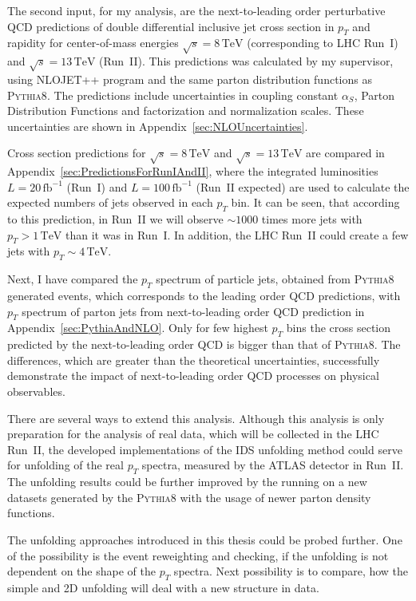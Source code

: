 \documentclass[a4paper,11pt,twoside,openright]{book}
\newcommand{\TeV}{\,\text{TeV}}
\newcommand{\pt}{p_{T}}
\begin{document}
The second input, for my analysis, are the next-to-leading order perturbative QCD
predictions of double differential inclusive jet cross section in $\pt$ and
rapidity for center-of-mass energies $\sqrt{s}=8\TeV$ (corresponding to LHC Run~I)
and $\sqrt{s}=13\TeV$ (Run~II). This predictions was calculated by my supervisor,
using \textsc{NLOJET++} program and the same parton distribution functions as
\textsc{Pythia8}. The predictions
include uncertainties in coupling constant $\alpha_S$, Parton Distribution
Functions and factorization and normalization scales. These uncertainties are
shown in Appendix~\ref{sec:NLOUncertainties}.

Cross section predictions for $\sqrt{s}=8\TeV$ and $\sqrt{s}=13\TeV$ are
compared in Appendix~\ref{sec:PredictionsForRunIAndII}, where the
integrated luminosities $L=20\,\text{fb}^{-1}$ (Run~I) and
$L=100\,\text{fb}^{-1}$ (Run~II expected) are used to calculate the expected
numbers of jets observed in each $\pt$ bin. It
can be seen, that according to
this prediction, in Run~II we will observe $\sim 1000$ times more jets with $\pt > 1\TeV$
than it was in Run~I. In addition, the LHC Run~II could create a few jets
with $\pt \sim 4 \TeV$.

Next, I have compared the $\pt$ spectrum of particle jets, obtained from
\textsc{Pythia8} generated events, which corresponds to the leading order QCD
predictions, with $\pt$ spectrum of parton jets from next-to-leading order QCD prediction in
Appendix~\ref{sec:PythiaAndNLO}. Only for few highest $\pt$ bins the cross section
predicted by the next-to-leading order QCD is bigger than that of
\textsc{Pythia8}. The differences, which are greater than the
theoretical uncertainties, successfully demonstrate the impact of
next-to-leading order QCD processes on physical observables.

There are several ways to extend this analysis. Although this analysis is only
preparation for the analysis of real data, which will be collected in the LHC Run~II,
the developed implementations of the IDS unfolding method could serve for
unfolding of the real $\pt$ spectra, measured by the ATLAS detector in Run~II.
The unfolding results could be further improved by the running on a new datasets
generated by the \textsc{Pythia8} with the usage of newer parton density
functions. 

The unfolding approaches introduced in this thesis could be probed further. One
of the possibility is the event reweighting and checking, if the unfolding is
not dependent on the shape of the $\pt$ spectra. Next possibility is to compare,
how the simple and 2D unfolding will deal with a new structure in data.
\end{document}
